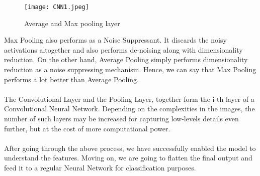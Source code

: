     \begin{figure}[h]
        \centering
        \texttt{[image: CNN1.jpeg]}
        \caption{Average and Max pooling layer}
    \end{figure}

    Max Pooling also performs as a Noise Suppressant. It discards the noisy activations altogether and also performs de-noising along with dimensionality reduction. On the other hand, Average Pooling simply performs dimensionality reduction as a noise suppressing mechanism. Hence, we can say that Max Pooling performs a lot better than Average Pooling.
\\ \\
    The Convolutional Layer and the Pooling Layer, together form the i-th layer of a Convolutional Neural Network. Depending on the complexities in the images, the number of such layers may be increased for capturing low-levels details even further, but at the cost of more computational power.
\\ \\
    After going through the above process, we have successfully enabled the model to understand the features. Moving on, we are going to flatten the final output and feed it to a regular Neural Network for classification purposes.
